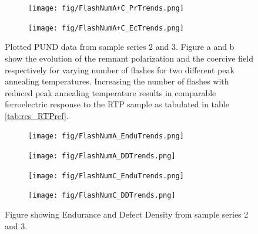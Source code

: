 \documentclass[11pt,twoside]{eitExjobb}
\begin{document}
\begin{figure}[htbp]
    \centering
    \begin{subfigure}{.4\linewidth}
        \texttt{[image: fig/FlashNumA+C\_PrTrends.png]}
        \caption{}\label{fig:res_NumACPr}
    \end{subfigure}
    \begin{subfigure}{.4\linewidth}
        \texttt{[image: fig/FlashNumA+C\_EcTrends.png]}
        \caption{}\label{fig:res_NumACEc}    
    \end{subfigure}
    \caption{Plotted PUND data from sample series 2 and 3. Figure a and b show the
    evolution of the remnant polarization and the coercive field respectively
    for varying number of flashes for two different peak annealing temperatures.
    Increasing the number of flashes with reduced peak annealing temperature
    results in comparable ferroelectric response to the RTP sample as tabulated
    in table \ref{tab:res_RTPref}.}\label{fig:res_NumACPUND}
\end{figure}

\begin{figure}[htbp]
    \centering
    \begin{subfigure}{.4\linewidth}
        \texttt{[image: fig/FlashNumA\_EnduTrends.png]}
        \caption{}\label{fig:res_NumAEndu}
    \end{subfigure}
    \begin{subfigure}{.4\linewidth}
        \texttt{[image: fig/FlashNumA\_DDTrends.png]}
        \caption{}\label{fig:res_NumADD}
    \end{subfigure}
    \begin{subfigure}{.4\linewidth}
        \texttt{[image: fig/FlashNumC\_EnduTrends.png]}
        \caption{}\label{fig:res_NumCEndu}
    \end{subfigure}
    \begin{subfigure}{.4\linewidth}
        \texttt{[image: fig/FlashNumC\_DDTrends.png]}
        \caption{}\label{fig:res_NumCDD}    
    \end{subfigure}
    \caption{Figure showing Endurance and Defect Density from sample series
    2 and 3.}\label{fig:res_NumACEnduDD}
\end{figure}

\end{document}
